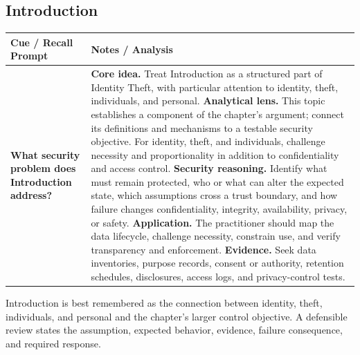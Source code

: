 \documentclass[11pt]{article}
\newcommand{\CornellHeader}{%
\rowcolor{Navy}\color{white}\bfseries Cue / Recall Prompt & \color{white}\bfseries Notes / Analysis\\\hline}
\newcommand{\CornellRow}[2]{%
\cellcolor{CueGray}\RaggedRight\textbf{#1} & \RaggedRight #2\\\hline}
\begin{document}
\subsection*{Introduction}
\begin{longtable}{>{\RaggedRight\arraybackslash}p{}|>{\RaggedRight\arraybackslash}p{}}
\CornellHeader
\CornellRow{What security problem does Introduction address?}{\textbf{Core idea.} Treat Introduction as a structured part of Identity Theft, with particular attention to identity, theft, individuals, and personal. \textbf{Analytical lens.} This topic establishes a component of the chapter's argument; connect its definitions and mechanisms to a testable security objective. For identity, theft, and individuals, challenge necessity and proportionality in addition to confidentiality and access control. \textbf{Security reasoning.} Identify what must remain protected, who or what can alter the expected state, which assumptions cross a trust boundary, and how failure changes confidentiality, integrity, availability, privacy, or safety. \textbf{Application.} The practitioner should map the data lifecycle, challenge necessity, constrain use, and verify transparency and enforcement. \textbf{Evidence.} Seek data inventories, purpose records, consent or authority, retention schedules, disclosures, access logs, and privacy-control tests.}
\end{longtable}
\begin{topicsummary}
Introduction is best remembered as the connection between identity, theft, individuals, and personal and the chapter's larger control objective. A defensible review states the assumption, expected behavior, evidence, failure consequence, and required response.
\end{topicsummary}
\end{document}
